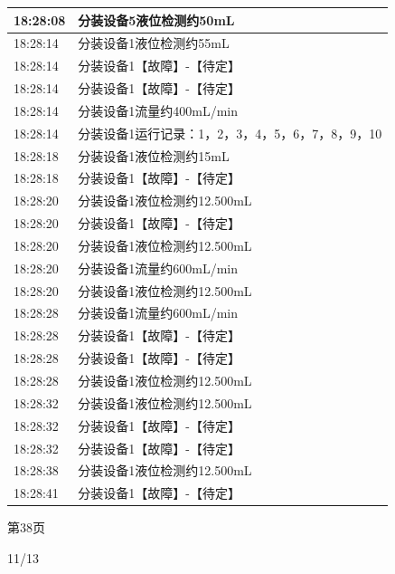 \documentclass[UTF8,10pt,a4paper,fontset=fandol]{ctexart}
\newcommand{\handwritten}[1]{#1}
\begin{document}
\begin{center}
\begin{minipage}[t]{0.46\linewidth}
\smallskip
\begin{tabular}{|p{1.05cm}|p{5.65cm}|}
\hline
18:28:08 & 分装设备5液位检测约50mL \\ \hline
18:28:14 & 分装设备1液位检测约55mL \\ \hline
18:28:14 & 分装设备1【故障】-【待定】 \\ \hline
18:28:14 & 分装设备1【故障】-【待定】 \\ \hline
18:28:14 & 分装设备1流量约400mL/min \\ \hline
18:28:14 & 分装设备1运行记录：1，2，3，4，5，6，7，8，9，10 \\ \hline
18:28:18 & 分装设备1液位检测约15mL \\ \hline
18:28:18 & 分装设备1【故障】-【待定】 \\ \hline
18:28:20 & 分装设备1液位检测约12.500mL \\ \hline
18:28:20 & 分装设备1【故障】-【待定】 \\ \hline
18:28:20 & 分装设备1液位检测约12.500mL \\ \hline
18:28:20 & 分装设备1流量约600mL/min \\ \hline
18:28:20 & 分装设备1液位检测约12.500mL \\ \hline
18:28:28 & 分装设备1流量约600mL/min \\ \hline
18:28:28 & 分装设备1【故障】-【待定】 \\ \hline
18:28:28 & 分装设备1【故障】-【待定】 \\ \hline
18:28:28 & 分装设备1液位检测约12.500mL \\ \hline
18:28:32 & 分装设备1液位检测约12.500mL \\ \hline
18:28:32 & 分装设备1【故障】-【待定】 \\ \hline
18:28:32 & 分装设备1【故障】-【待定】 \\ \hline
18:28:38 & 分装设备1液位检测约12.500mL \\ \hline
18:28:41 & 分装设备1【故障】-【待定】 \\ \hline
\end{tabular}

\vspace{0.2cm}
第38页
\end{minipage}
\end{center}


\handwritten{11/13}
\end{document}
